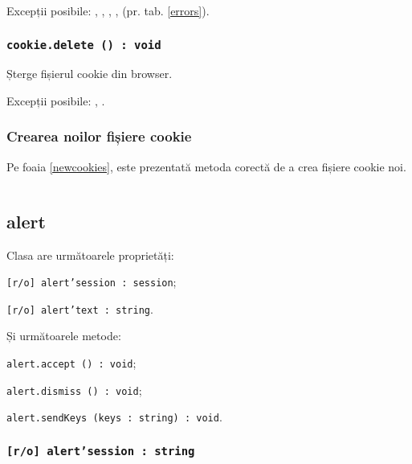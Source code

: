 Excepții posibile: , , , ,  (pr. tab. \ref{errors}).

\subsubsection{\texttt{cookie.delete () : void}}

Șterge fișierul cookie din browser.

Excepții posibile: , .

\subsubsection{Crearea noilor fișiere cookie}

Pe foaia \ref{newcookies}, este prezentată metoda corectă de a crea fișiere cookie noi.

\begin{sourcecode}
    \label{newcookies}
    \inputminted[linenos]{icl}{../sources/newcookies.icL}
\end{sourcecode}

\subsection{alert}

Clasa \alert{} are următoarele proprietăți:
\begin{icItems}
	\item \texttt{[r/o] alert'session : session};
	\item \texttt{[r/o] alert'text : string}.
\end{icItems}

Și următoarele metode:
\begin{icItems}
	\item \texttt{alert.accept () : void};
	\item \texttt{alert.dismiss () : void};
	\item \texttt{alert.sendKeys (keys : string) : void}.
\end{icItems}

\subsubsection{\texttt{[r/o] alert'session : string}}

